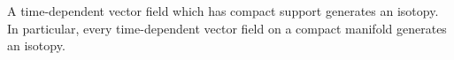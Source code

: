 A time-dependent vector field which has compact support generates an isotopy. In particular, every time-dependent vector field on a compact manifold generates an isotopy.
